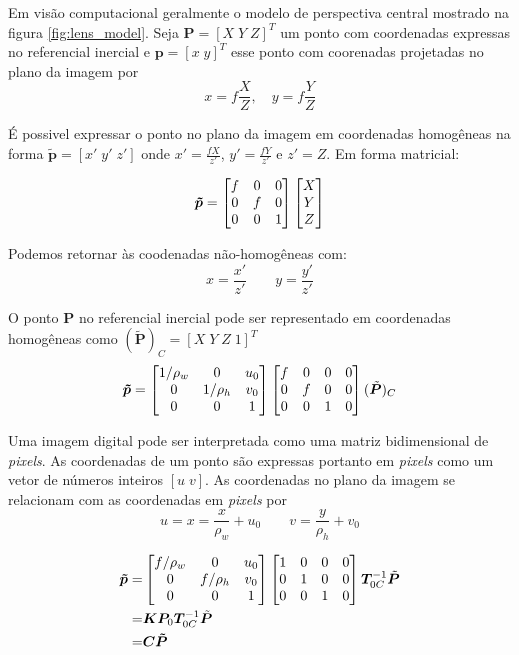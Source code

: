 Em visão computacional geralmente o modelo de perspectiva central mostrado na figura \ref{fig:lens_model}.
Seja $\bm{P} = [X\; Y\; Z]^T$ um ponto com coordenadas expressas no referencial inercial e $\bm{p} = [x\;y]^T$ esse ponto com coorenadas projetadas no plano da imagem por
\begin{equation}
x = f \frac{X}{Z}, \quad y = f \frac{Y}{Z}
\end{equation}

É possivel expressar o ponto no plano da imagem em coordenadas homogêneas na forma $\tilde{\bm{p}} = [x'\; y' \; z']$ onde $x' = \frac{fX}{z'}$, $y' = \frac{fY}{z'}$ e $z' = Z$. Em forma matricial:

\begin{equation}
\bm{\tilde{p}} = 
\begin{bmatrix} f & 0 & 0 \\
	 0 & f & 0 \\
	 0 & 0 & 1	
\end{bmatrix}
\begin{bmatrix}X\\Y\\Z\end{bmatrix}
\end{equation}

Podemos retornar às coodenadas não-homogêneas com:
\[ x = \frac{x'}{z'} \qquad y = \frac{y'}{z'}\]

O ponto $\bm{P}$ no referencial inercial pode ser representado em coordenadas homogêneas como $(\bm{\tilde{P}})_C = [X \; Y \; Z \; 1]^T$
\begin{equation}
\bm{\tilde{p}} = 
\begin{bmatrix}
	1/\rho_w & 0 & u_0 \\
	0        & 1/\rho_h &v_0 \\
	0 & 0 & 1 \\
\end{bmatrix}
\begin{bmatrix} f & 0 & 0 & 0\\
	 0 & f & 0 & 0\\
	 0 & 0 & 1 & 0	
\end{bmatrix}
(\tilde{\bm{P}})_C
\end{equation}

Uma imagem digital pode ser interpretada como uma matriz bidimensional de \textit{pixels}. As coordenadas de um ponto são expressas portanto em \textit{pixels} como um vetor de números inteiros $[u\; v]$. As coordenadas no plano da imagem se relacionam com as coordenadas em \textit{pixels} por
\begin{equation}
u = x = \frac{x}{\rho_w} + u_0 \qquad v = \frac{y}{\rho_h} + v_0
\end{equation}


\begin{align}\label{eq:camera_projection}
\bm{\tilde{p}} =& 
\begin{bmatrix}
	f/\rho_w & 0 & u_0 \\
	0        & f/\rho_h &v_0 \\
	0 & 0 & 1 \\
\end{bmatrix}
\begin{bmatrix}  1 & 0 & 0 & 0\\
	 0 & 1 & 0 & 0\\
	 0 & 0 & 1 & 0	
\end{bmatrix}
\bm{T}_{0C}^{-1}\tilde{\bm{P}}\\
=& \bm{K} \bm{P}_0 \bm{T}_{0C}^{-1} \tilde{\bm{P}} \\ 
=& \bm{C} \bm{\tilde{P}}
\end{align}

